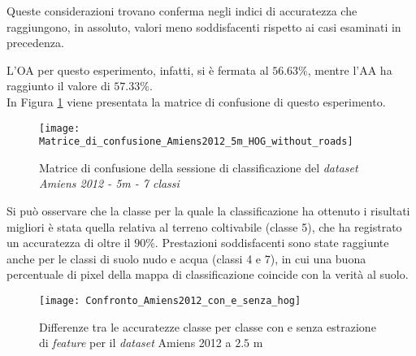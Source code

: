 Queste considerazioni trovano conferma negli indici di accuratezza che
raggiungono, in assoluto, valori meno soddisfacenti rispetto ai casi
esaminati in precedenza.

L'OA per questo esperimento, infatti, si è fermata al $56.63\%$,
mentre l'AA ha raggiunto il valore di $57.33\%$.\\

In Figura \ref{fig:Matrice_di_confusione_Amiens2012_5m_HOG_without_roads}
viene presentata la matrice di confusione di questo esperimento. \\

\begin{figure}[!ht]

\texttt{[image: Matrice\_di\_confusione\_Amiens2012\_5m\_HOG\_without\_roads]}

\caption{Matrice di confusione della sessione di classificazione del
\emph{dataset} \emph{Amiens 2012 - 5m - 7 classi}}

\label{fig:Matrice_di_confusione_Amiens2012_5m_HOG_without_roads}
\end{figure}

Si può osservare che la classe per la quale la classificazione ha
ottenuto i risultati migliori è stata quella relativa al terreno
coltivabile (classe 5), che ha registrato un accuratezza di oltre il $90\%$.
Prestazioni soddisfacenti sono state raggiunte anche per le classi di
suolo nudo e acqua (classi 4 e 7), in cui una buona percentuale di
pixel della mappa di classificazione coincide con la verità al
suolo.\\

%
%
%
%
%
%
%

\begin{figure}[!ht]

\texttt{[image: Confronto\_Amiens2012\_con\_e\_senza\_hog]}

\caption{Differenze tra le accuratezze classe per classe con e
senza estrazione di \emph{feature} per il \emph{dataset} Amiens 2012 a
$2.5$ m}

\label{fig:Confronto_Amiens2012_2.5m}

\end{figure}


